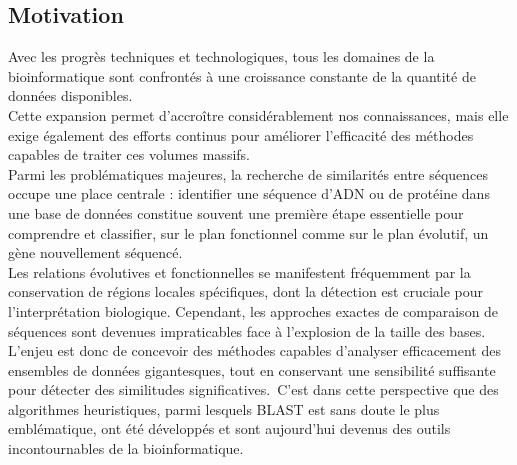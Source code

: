\documentclass[conference]{IEEEtran}
\begin{document}
\subsection{Motivation}
Avec les progrès techniques et technologiques, tous les domaines de la bioinformatique sont confrontés à une croissance constante de la quantité de données disponibles.\\
Cette expansion permet d’accroître considérablement nos connaissances, mais elle exige également des efforts continus pour améliorer l’efficacité des méthodes capables de traiter ces volumes massifs.\\
Parmi les problématiques majeures, la recherche de similarités entre séquences occupe une place centrale : identifier une séquence d’ADN ou de protéine dans une base de données constitue souvent une première étape essentielle pour comprendre et classifier, sur le plan fonctionnel comme sur le plan évolutif, un gène nouvellement séquencé.\\
Les relations évolutives et fonctionnelles se manifestent fréquemment par la conservation de régions locales spécifiques, dont la détection est cruciale pour l’interprétation biologique. Cependant, les approches exactes de comparaison de séquences sont devenues impraticables face à l’explosion de la taille des bases.\\
L’enjeu est donc de concevoir des méthodes capables d’analyser efficacement des ensembles de données gigantesques, tout en conservant une sensibilité suffisante pour détecter des similitudes significatives.\
C’est dans cette perspective que des algorithmes heuristiques, parmi lesquels BLAST est sans doute le plus emblématique, ont été développés et sont aujourd’hui devenus des outils incontournables de la bioinformatique.
\end{document}
